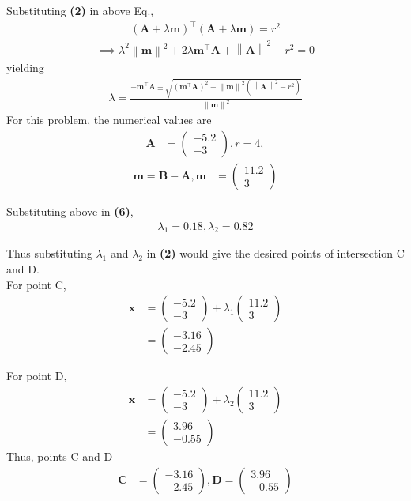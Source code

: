 \documentclass[10pt,a4paper]{report}
\providecommand{\norm}[1]{\left\lVert#1\right\rVert}
\providecommand{\brak}[1]{\ensuremath{\left(#1\right)}}
\newcommand{\myvec}[1]{\ensuremath{\begin{pmatrix}#1\end{pmatrix}}}
\let\vec\mathbf
\begin{document}
\begin{multicols}{2}
Substituting \textbf{(2)} in above Eq.,
\begin{align}
	\brak{ \vec{A} + \lambda \vec{m}}^{\top}
	\brak{ \vec{A} + \lambda \vec{m}}
	= r^2
\end{align}
\begin{align}
    \implies \lambda^2\norm{\vec{m}}^2+ 2 \lambda \vec{m}^{\top}\vec{A}+\norm{\vec{A}}^2 - r^2 = 0
\end{align}
yielding 
		    {\small
		    \begin{align}
			    \label{eq:cbse-2020-circ_lam}
		\lambda = \frac{-\vec{m}^{\top}\vec{A}\pm \sqrt{\brak{\vec{m}^{\top}\vec{A}}^2 -\norm{\vec{m}}^2\brak{\norm{\vec{A}}^2 - r^2 }}}{\norm{\vec{m}}^2}
		    \end{align}
		    }
For this problem, the numerical values are
\begin{align}
\vec{A} &= \myvec{-5.2 \\ -3}, r = 4, 
\end{align}
\begin{align}
\vec{m} = \vec{B} - \vec{A}, \vec{m} &= \myvec{11.2 \\ 3}
\end{align}

Substituting above in \textbf{(6)},
\begin{align}
\lambda_1 = 0.18, \lambda_2 = 0.82
\end{align}

Thus substituting $\lambda_1$ and $\lambda_2$ in {\textbf{(2)}} would give the desired points of intersection C and D.\vspace{2mm}\\

For point C,
\begin{align}
\vec{x} &= \myvec{-5.2 \\ -3} +  \lambda_1 \myvec{11.2 \\ 3}
\\
&= \myvec{-3.16 \\ -2.45}
\end{align}

For point D,
\begin{align}
\vec{x} &= \myvec{-5.2 \\ -3} +  \lambda_2 \myvec{11.2 \\ 3}
\\
&= \myvec{3.96 \\ -0.55}
\end{align}
Thus, points C and D
\begin{align}
\vec{C} &= \myvec{-3.16 \\ -2.45}, \vec{D} = \myvec{3.96 \\ -0.55} 
\end{align}


\end{multicols}
\end{document}
